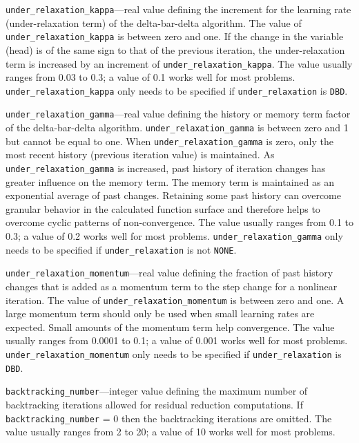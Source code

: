 \item \texttt{under\_relaxation\_kappa}---real value defining the increment for the learning rate (under-relaxation term) of the delta-bar-delta algorithm. The value of \texttt{under\_relaxation\_kappa} is between zero and one. If the change in the variable (head) is of the same sign to that of the previous iteration, the under-relaxation term is increased by an increment of \texttt{under\_relaxation\_kappa}. The value usually ranges from 0.03 to 0.3; a value of 0.1 works well for most problems. \texttt{under\_relaxation\_kappa} only needs to be specified if \texttt{under\_relaxation} is \texttt{DBD}.

\item \texttt{under\_relaxation\_gamma}---real value defining the history or memory term factor of the delta-bar-delta algorithm. \texttt{under\_relaxation\_gamma} is between zero and 1 but cannot be equal to one. When \texttt{under\_relaxation\_gamma} is zero, only the most recent history (previous iteration value) is maintained. As \texttt{under\_relaxation\_gamma} is increased, past history of iteration changes has greater influence on the memory term. The memory term is maintained as an exponential average of past changes. Retaining some past history can overcome granular behavior in the calculated function surface and therefore helps to overcome cyclic patterns of non-convergence. The value usually ranges from 0.1 to 0.3; a value of 0.2 works well for most problems. \texttt{under\_relaxation\_gamma} only needs to be specified if \texttt{under\_relaxation} is not \texttt{NONE}.

\item \texttt{under\_relaxation\_momentum}---real value defining the fraction of past history changes that is added as a momentum term to the step change for a nonlinear iteration. The value of \texttt{under\_relaxation\_momentum} is between zero and one. A large momentum term should only be used when small learning rates are expected. Small amounts of the momentum term help convergence. The value usually ranges from 0.0001 to 0.1; a value of 0.001 works well for most problems. \texttt{under\_relaxation\_momentum} only needs to be specified if \texttt{under\_relaxation} is \texttt{DBD}.

\item \texttt{backtracking\_number}---integer value defining the maximum number of backtracking iterations allowed for residual reduction computations. If \texttt{backtracking\_number} = 0 then the backtracking iterations are omitted. The value usually ranges from 2 to 20; a value of 10 works well for most problems.


